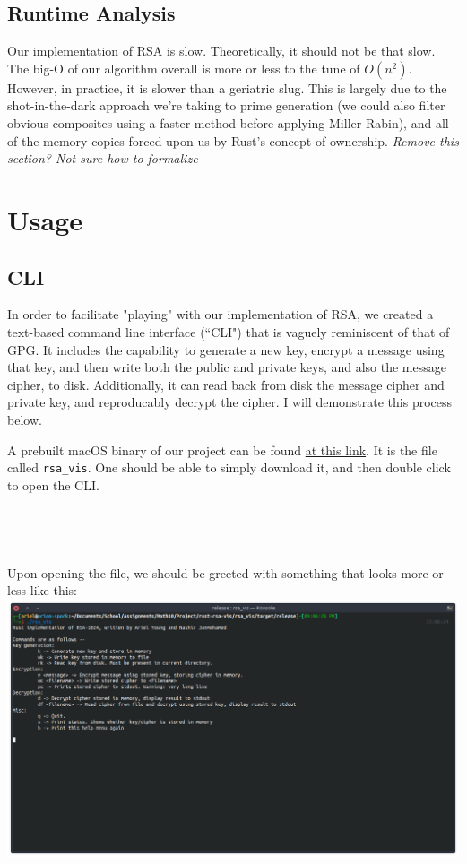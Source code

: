 \documentclass{article}
\newcommand{\code}[1]{\colorbox{light-gray}{\texttt{#1}}}
\begin{document}
\subsection{Runtime Analysis}
Our implementation of RSA is slow. Theoretically, it should not be that slow. The big-O of our algorithm overall is more or less to the tune of $O(n^2)$. However, in practice, it is slower than a geriatric slug. This is largely due to the shot-in-the-dark approach we're taking to prime generation (we could also filter obvious composites using a faster method before applying Miller-Rabin), and all of the memory copies forced upon us by Rust's concept of ownership. \textit{Remove this section? Not sure how to formalize}


\section{Usage}
\subsection{CLI}
In order to facilitate "playing" with our implementation of RSA, we created a text-based command line interface (``CLI") that is vaguely reminiscent of that of GPG. It includes the capability to generate a new key, encrypt a message using that key, and then write both the public and private keys, and also the message cipher, to disk. Additionally, it can read back from disk the message cipher and private key, and reproducably decrypt the cipher. I will demonstrate this process below.

A prebuilt macOS binary of our project can be found \href{https://github.com/DarthGeek01/rust-rsa-vis/releases/tag/v0.0}{at this link}. It is the file called \code{rsa\_vis}. One should be able to simply download it, and then double click to open the CLI.
\\\\\\\\\\
Upon opening the file, we should be  greeted with something that looks more-or-less like this: \\
\includegraphics[width=\textwidth]{one}
\end{document}
